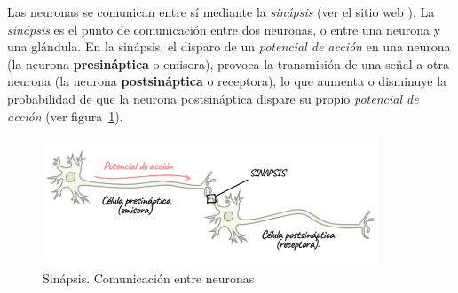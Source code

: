 Las neuronas se comunican entre sí mediante la \textit{sinápsis} (ver el sitio web \cite{khanacademywebsite}). La \textit{sinápsis} es el punto de comunicación entre dos neuronas, o entre una neurona y una glándula. En la sinápsis, el disparo de un \textit{potencial de acción} en una neurona (la neurona \textbf{presináptica} o emisora), provoca la transmisión de una señal a otra neurona (la neurona \textbf{postsináptica} o receptora), lo que aumenta o disminuye la probabilidad de que la neurona postsináptica dispare su propio \textit{potencial de acción} (ver figura~\ref{fig:Sinapsis}). 
\begin{figure}[htbp!]
    \centering
    \includegraphics[width=10.0cm]{figures/Sinapsis.png}
    \caption{Sinápsis. Comunicación entre neuronas}
    \label{fig:Sinapsis}
\end{figure}
